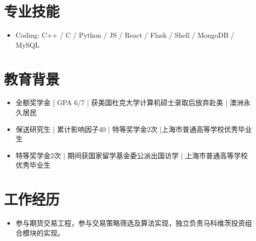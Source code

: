 \documentclass{resume}
\begin{document}


 
\section{专业技能}
\begin{itemize}
  \item Coding: C++ / C / Python / JS / React / Flask / Shell / MongoDB / MySQL
\end{itemize}

\section{教育背景}
\begin{itemize}
\item 全额奖学金 | GPA 6/7 | 获美国杜克大学计算机硕士录取后放弃赴美 | 澳洲永久居民
\end{itemize}

\begin{itemize}
\item 保送研究生 | 累计影响因子40 | 特等奖学金2次 |上海市普通高等学校优秀毕业生
\end{itemize}

\begin{itemize}
\item 特等奖学金2次 | 期间获国家留学基金委公派出国访学 | 上海市普通高等学校优秀毕业生
\end{itemize}


\section{工作经历}
\begin{itemize}
  \item 参与期货交易工程，参与交易策略筛选及算法实现，独立负责马科维茨投资组合模块的实现。
\end{itemize}
\end{document}
